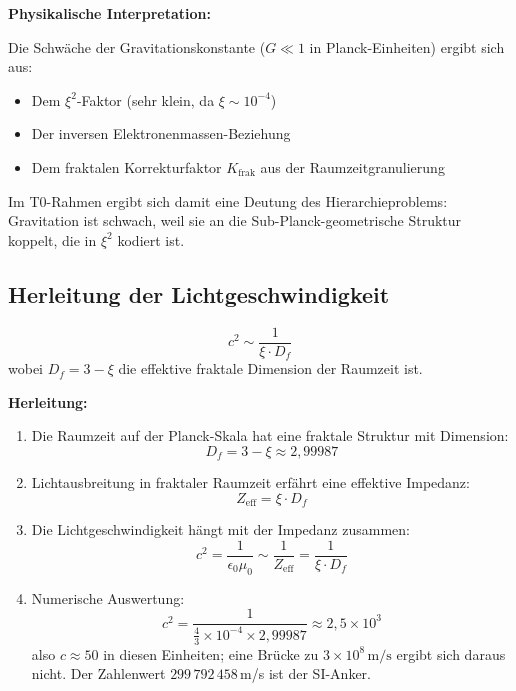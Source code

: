 	\textbf{Physikalische Interpretation:}
	
	Die Schwäche der Gravitationskonstante ($G \ll 1$ in Planck-Einheiten) ergibt sich aus:
	\begin{itemize}
		\item Dem $\xi^2$-Faktor (sehr klein, da $\xi \sim 10^{-4}$)
		\item Der inversen Elektronenmassen-Beziehung
		\item Dem fraktalen Korrekturfaktor $K_{\text{frak}}$ aus der Raumzeitgranulierung
	\end{itemize}
	
	Im T0-Rahmen ergibt sich damit eine Deutung des Hierarchieproblems: Gravitation ist schwach, weil sie an die Sub-Planck-geometrische Struktur koppelt, die in $\xi^2$ kodiert ist.
	
	\subsection{Herleitung der Lichtgeschwindigkeit}
	
	\begin{keyresult}
		\[
		c^2 \sim \frac{1}{\xi \cdot D_f}
		\]
		wobei $D_f = 3 - \xi$ die effektive fraktale Dimension der Raumzeit ist.
	\end{keyresult}
	
	\textbf{Herleitung:}
	
	\begin{enumerate}
		\item Die Raumzeit auf der Planck-Skala hat eine fraktale Struktur mit Dimension:
		\[
		D_f = 3 - \xi \approx 2{,}99987
		\]
		
		\item Lichtausbreitung in fraktaler Raumzeit erfährt eine effektive Impedanz:
		\[
		Z_{\text{eff}} = \xi \cdot D_f
		\]
		
		\item Die Lichtgeschwindigkeit hängt mit der Impedanz zusammen:
		\[
		c^2 = \frac{1}{\epsilon_0 \mu_0} \sim \frac{1}{Z_{\text{eff}}} = \frac{1}{\xi \cdot D_f}
		\]
		
		\item Numerische Auswertung:
		\[
		c^2 = \frac{1}{\frac{4}{3} \times 10^{-4} \times 2{,}99987} \approx 2{,}5 \times 10^{3}
		\]
		also $c \approx 50$ in diesen Einheiten; eine Brücke zu $3 \times 10^8\,\text{m/s}$ ergibt sich daraus nicht. Der Zahlenwert $299\,792\,458$\,m/s ist der SI-Anker.
	\end{enumerate}
	
